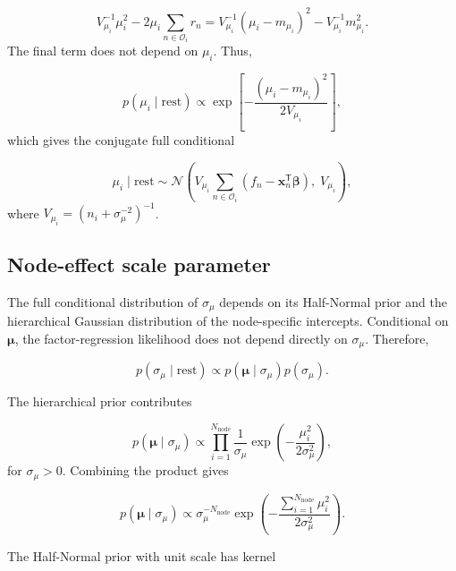 \documentclass[pdftex,12pt,openright,a4paper,oneside]{book}
\begin{document}
\begin{equation*}
V_{\mu_i}^{-1}\mu_i^2
-2\mu_i\sum_{n\in\mathcal{O}_i}r_n=
V_{\mu_i}^{-1}
(\mu_i-m_{\mu_i})^2
-
V_{\mu_i}^{-1}m_{\mu_i}^2.
\end{equation*}
The final term does not depend on $\mu_i$.
Thus,

\begin{equation*}
p(\mu_i\mid\mathrm{rest})
\propto
\exp\left[
-\frac{
(\mu_i-m_{\mu_i})^2
}{
2V_{\mu_i}
}
\right],
\end{equation*}
which gives the conjugate full conditional

\begin{equation*}
\mu_i\mid\mathrm{rest}
\sim
\mathcal{N}
\left(
V_{\mu_i}
\sum_{n\in\mathcal{O}_i}
(f_n-\mathbf{x}_n^{\mathsf T}
\boldsymbol{\beta}),
\;
V_{\mu_i}
\right),
\end{equation*}
where $V_{\mu_i}=
\left(
n_i+\sigma_\mu^{-2}
\right)^{-1}$.

\subsection{Node-effect scale parameter}
\label{app:node_sigma_conditional}

The full conditional distribution of
$\sigma_\mu$ depends on its Half-Normal
prior and the hierarchical Gaussian
distribution of the node-specific intercepts.
Conditional on $\boldsymbol{\mu}$,
the factor-regression likelihood does not
depend directly on $\sigma_\mu$.
Therefore,

\begin{equation*}
p(\sigma_\mu\mid\mathrm{rest})
\propto
p(\boldsymbol{\mu}\mid\sigma_\mu)
p(\sigma_\mu).
\end{equation*}

The hierarchical prior contributes

\begin{equation*}
p(\boldsymbol{\mu}\mid\sigma_\mu)
\propto
\prod_{i=1}^{N_{\mathrm{node}}}
\frac{1}{\sigma_\mu}
\exp\left(
-\frac{\mu_i^2}{2\sigma_\mu^2}
\right),
\end{equation*}
for $\sigma_\mu>0$.
Combining the product gives

\begin{equation*}
p(\boldsymbol{\mu}\mid\sigma_\mu)
\propto
\sigma_\mu^{-N_{\mathrm{node}}}
\exp\left(
-\frac{
\sum_{i=1}^{N_{\mathrm{node}}}\mu_i^2
}{
2\sigma_\mu^2
}
\right).
\end{equation*}

The Half-Normal prior with unit scale has kernel
\end{document}
